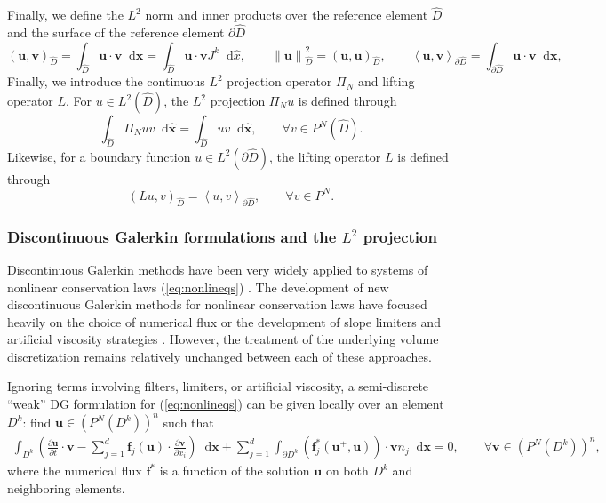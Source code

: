 \documentclass[preprint,10pt]{article}
\theoremstyle{definition}
\theoremstyle{lemma}
\theoremstyle{theorem}
\theoremstyle{assumption}
\renewcommand{\hat}{\widehat}
\newcommand{\pd}[2]{\frac{\partial#1}{\partial#2}}
\newcommand{\nor}[1]{\left\| #1 \right\|}
\newcommand{\LRp}[1]{\left( #1 \right)}
\newcommand{\LRa}[1]{\left\langle #1 \right\rangle}
\newcommand*\diff[1]{\mathop{}\!{\mathrm{d}#1}} %
\begin{document}
Finally, we define the $L^2$ norm and inner products over the reference element $\hat{D}$ and the surface of the reference element $\partial \hat{D}$
\[
\LRp{\bm{u},\bm{v}}_{\hat{D}} = \int_{\hat{D}} \bm{u}\cdot\bm{v}\diff{\bm{x}} =  \int_{\widehat{D}} \bm{u}\cdot\bm{v} J^k \diff{\widehat{x}}, \qquad \nor{\bm{u}}^2_{\hat{D}} = (\bm{u},\bm{u})_{\hat{D}}, \qquad \LRa{\bm{u},\bm{v}}_{\partial \hat{D}} = \int_{\partial \hat{D}} \bm{u} \cdot \bm{v} \diff{\bm{x}},
\]
Finally, we introduce the continuous $L^2$ projection operator $\Pi_N$ and lifting operator $L$.  For $u \in L^2\LRp{\widehat{D}}$, the $L^2$ projection $\Pi_N u$ is defined through
\begin{equation}
\int_{\widehat{D}} \Pi_N u v \diff{\hat{\bm{x}}} = \int_{\widehat{D}} u v \diff{\hat{\bm{x}}}, \qquad \forall v\in P^N\LRp{\hat{D}}.
\label{eq:l2proj}
\end{equation}
Likewise, for a boundary function $u \in L^2\LRp{\partial \hat{D}}$, the lifting operator $L$ \cite{hesthaven2007nodal, di2011mathematical} is defined through 
\begin{equation}
\LRp{L u,v}_{\hat{D}} = \LRa{u,v}_{\partial \hat{D}}, \qquad \forall v \in P^N.
\label{eq:lift}
\end{equation}


\subsubsection{Discontinuous Galerkin formulations and the $L^2$ projection}

Discontinuous Galerkin methods have been very widely applied to systems of nonlinear conservation laws (\ref{eq:nonlineqs}) \cite{cockburn1989tvb, cockburn1998runge, cockburn2001devising, karniadakis2013spectral}.  The development of new discontinuous Galerkin methods for nonlinear conservation laws have focused heavily on the choice of numerical flux \cite{qiu2006numerical} or the development of  slope limiters \cite{krivodonova2007limiters, zhang2012maximum, dumbser2014posteriori} and artificial viscosity strategies \cite{persson2006sub, barter2010shock, klockner2011viscous}.  However, the treatment of the underlying volume discretization remains relatively unchanged between each of these approaches.  

Ignoring terms involving filters, limiters, or artificial viscosity, a semi-discrete ``weak'' DG formulation  for (\ref{eq:nonlineqs}) can be given locally over an element $D^k$: find $\bm{u}\in \LRp{P^N\LRp{D^k}}^n$ such that
\begin{align}
\int_{D^k} \LRp{\pd{\bm{u}}{t}\cdot \bm{v} - \sum_{j=1}^d\bm{f}_j(\bm{u}) \cdot \pd{\bm{v}}{x_i}} \diff{\bm{x}} 
+ \sum_{j=1}^d \int_{\partial D^k} \LRp{\bm{f}^*_j\LRp{\bm{u}^+,\bm{u}} }\cdot \bm{v} n_j  \diff{\bm{x}} = 0, \qquad \forall \bm{v}\in \LRp{P^N\LRp{D^k}}^n,
\label{eq:weakdg}
\end{align}
where the numerical flux $\bm{f}^*$ is a function of the solution $\bm{u}$ on both $D^k$ and neighboring elements.  
\end{document}
